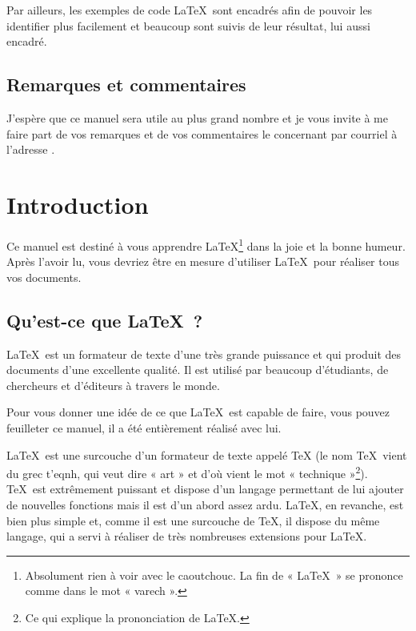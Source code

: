 \documentclass[a4paper,11pt,openbib]{book}
\begin{document}
Par ailleurs, les exemples de code \LaTeX\ sont encadrés afin de pouvoir les
identifier plus facilement et beaucoup sont suivis de leur résultat, lui aussi
encadré.

\section*{Remarques et commentaires}

J'espère que ce manuel sera utile au plus grand nombre et je vous invite à me
faire part de vos remarques et de vos commentaires le concernant par courriel à
l'adresse
\href{mailto:babafou\%2Blatex@babafou.eu.org}{}.


\mainmatter

\pagestyle{fancy}


\chapter{Introduction}
\label{chapitre:introduction}

Ce manuel est destiné à vous apprendre \LaTeX\footnote{Absolument rien à voir
avec le caoutchouc. La fin de « \LaTeX\ » se prononce comme dans le mot
« varech ».} dans la joie et la bonne humeur. Après l'avoir lu, vous devriez
être en mesure d'utiliser \LaTeX\ pour réaliser tous vos documents.

\section{Qu'est-ce que \LaTeX\ ?}

\LaTeX\ est un formateur de texte d'une très grande puissance et qui produit des
documents d'une excellente qualité. Il est utilisé par beaucoup d'étudiants, de
chercheurs et d'éditeurs à travers le monde.

Pour vous donner une idée de ce que \LaTeX\ est capable de faire, vous pouvez
feuilleter ce manuel, il a été entièrement réalisé avec lui.

\LaTeX\ est une surcouche d'un formateur de texte appelé \TeX{}
(le nom \TeX\ vient du grec \textgreek{t'eqnh}, qui veut dire « art » et d'où
vient le mot « technique »\footnote{Ce qui explique la prononciation de
\LaTeX.}). \TeX\ est extrêmement puissant et dispose d'un langage permettant de
lui ajouter de nouvelles fonctions mais il est d'un abord assez ardu. \LaTeX, en
revanche, est bien plus simple et, comme il est une surcouche de \TeX, il
dispose du même langage, qui a servi à réaliser de très nombreuses extensions
pour \LaTeX.
\end{document}
